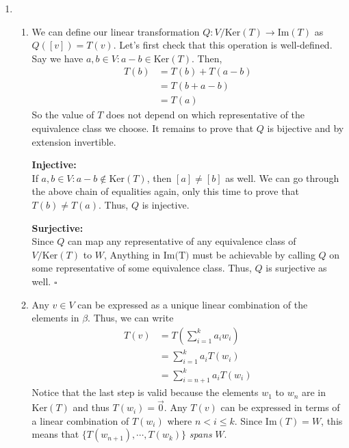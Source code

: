 \documentclass[12pt]{article}
\begin{document}
\begin{enumerate}
      \item \begin{enumerate}
                  \item We can define our linear transformation $Q: V/\text{Ker}(T) \rightarrow \text{Im}(T)$ as $Q([v])=T(v)$.
                        Let's first check that this operation is well-defined.
                        Say we have $a, b \in V: a-b \in \text{Ker}(T)$.
                        Then, \begin{align*}
                              T(b) & =T(b)+T(a-b) \\
                                   & = T(b+a-b)   \\
                                   & = T(a)
                        \end{align*}
                        So the value of $T$ does not depend on which representative of the equivalence class we choose.
                        It remains to prove that $Q$ is bijective and by extension invertible.

                        \textbf{Injective:} \\
                        If $a, b \in V: a-b \notin \text{Ker}(T)$, then $[a] \ne [b]$ as well.
                        We can go through the above chain of equalities again, only this time to prove that $T(b) \ne T(a)$.
                        Thus, $Q$ is injective.

                        \textbf{Surjective:} \\
                        Since $Q$ can map any representative of any equivalence class of $V/\text{Ker}(T)$ to $W$,
                        Anything in $\text{Im(T)}$ must be achievable by calling $Q$ on some representative of some equivalence class.
                        Thus, $Q$ is surjective as well. $\square$
                  \item Any $v \in V$ can be expressed as a unique linear combination of the elements in $\beta$.
                        Thus, we can write \begin{align*}
                              T(v) & =T\left(\sum_{i=1}^{k} a_iw_i\right) \\
                                   & =\sum_{i=1}^{k} a_iT(w_i)            \\
                                   & =\sum_{i=n+1}^{k} a_iT(w_i)
                        \end{align*}
                        Notice that the last step is valid because the elements $w_1$ to $w_n$
                        are in $\text{Ker}(T)$ and thus $T(w_i)=\vec{0}$.
                        Any $T(v)$ can be expressed in terms of a linear combination of $T(w_i)$ where $n < i \le k$.
                        Since $\text{Im}(T)=W$, this means that $\{T(w_{n+1}), \cdots, T(w_k)\}$ \textit{spans} $W$.


\end{enumerate}
\end{enumerate}
\end{document}
